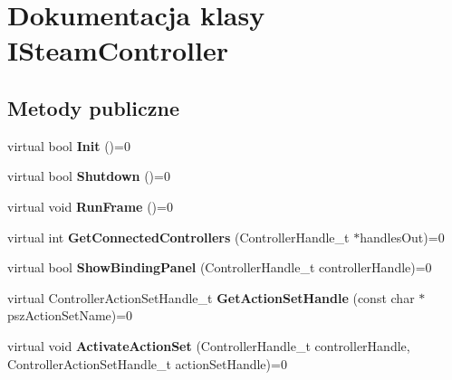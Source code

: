 \hypertarget{class_i_steam_controller}{}\section{Dokumentacja klasy I\+Steam\+Controller}
\label{class_i_steam_controller}
\subsection*{Metody publiczne}
\begin{DoxyCompactItemize}
\item 
\mbox{\label{class_i_steam_controller_a2637db8d967b343d38b6ad3cc9382815}} 
virtual bool {\bfseries Init} ()=0
\item 
\mbox{\label{class_i_steam_controller_a890b4d6da07a7f082d97a599a453ba82}} 
virtual bool {\bfseries Shutdown} ()=0
\item 
\mbox{\label{class_i_steam_controller_a648bba21ca5b9a1543c378a9fdda84e3}} 
virtual void {\bfseries Run\+Frame} ()=0
\item 
\mbox{\label{class_i_steam_controller_abe484713118bf029423d35d6e0f2f308}} 
virtual int {\bfseries Get\+Connected\+Controllers} (Controller\+Handle\+\_\+t $\ast$handles\+Out)=0
\item 
\mbox{\label{class_i_steam_controller_af20ed753cb0f55fa58e988c9a35f0b7c}} 
virtual bool {\bfseries Show\+Binding\+Panel} (Controller\+Handle\+\_\+t controller\+Handle)=0
\item 
\mbox{\label{class_i_steam_controller_a532c1d2e1af82b7659a957e60e8ff833}} 
virtual Controller\+Action\+Set\+Handle\+\_\+t {\bfseries Get\+Action\+Set\+Handle} (const char $\ast$psz\+Action\+Set\+Name)=0
\item 
\mbox{\label{class_i_steam_controller_a0524cff763ac0e766e3a17d90205d359}} 
virtual void {\bfseries Activate\+Action\+Set} (Controller\+Handle\+\_\+t controller\+Handle, Controller\+Action\+Set\+Handle\+\_\+t action\+Set\+Handle)=0
\item 
\mbox{\label{class_i_steam_controller_a1e42054a69a75f0e4829eb3889a1824d}} 

\end{DoxyCompactItemize}
